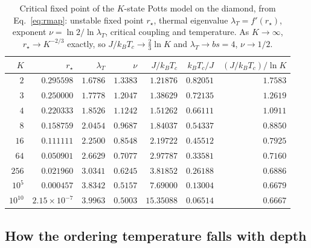 \documentclass[preprint,12pt]{elsarticle}
\begin{document}
\begin{table}[tb]
  \centering
  \caption{Critical fixed point of the $K$-state Potts model on the diamond,
  from Eq.~\eqref{eq:rmap}: unstable fixed point $r_\star$, thermal eigenvalue
  $\lambda_T=f'(r_\star)$, exponent $\nu=\ln2/\ln\lambda_T$, critical coupling
  and temperature. As $K\to\infty$, $r_\star\to K^{-2/3}$ exactly, so
  $J/k_BT_c\to\tfrac23\ln K$ and $\lambda_T\to bs=4$, $\nu\to1/2$.}
  \label{tab:potts}
  \begin{tabular}{rrrrrrr}
    \toprule
    $K$ & $r_\star$ & $\lambda_T$ & $\nu$ & $J/k_BT_c$ & $k_BT_c/J$
        & $(J/k_BT_c)/\ln K$\\
    \midrule
    $2$        & $0.295598$ & $1.6786$ & $1.3383$ & $1.21876$  & $0.82051$ & $1.7583$\\
    $3$        & $0.250000$ & $1.7778$ & $1.2047$ & $1.38629$  & $0.72135$ & $1.2619$\\
    $4$        & $0.220333$ & $1.8526$ & $1.1242$ & $1.51262$  & $0.66111$ & $1.0911$\\
    $8$        & $0.158759$ & $2.0454$ & $0.9687$ & $1.84037$  & $0.54337$ & $0.8850$\\
    $16$       & $0.111111$ & $2.2500$ & $0.8548$ & $2.19722$  & $0.45512$ & $0.7925$\\
    $64$       & $0.050901$ & $2.6629$ & $0.7077$ & $2.97787$  & $0.33581$ & $0.7160$\\
    $256$      & $0.021960$ & $3.0341$ & $0.6245$ & $3.81852$  & $0.26188$ & $0.6886$\\
    $10^{5}$   & $0.000457$ & $3.8342$ & $0.5157$ & $7.69000$  & $0.13004$ & $0.6679$\\
    $10^{10}$  & $2.15{\times}10^{-7}$ & $3.9963$ & $0.5003$ & $15.35088$ & $0.06514$ & $0.6667$\\
    \bottomrule
  \end{tabular}
\end{table}

\subsection{How the ordering temperature falls with depth}
\end{document}
